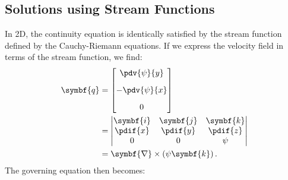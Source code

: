 \documentclass{article}
\theoremstyle{definition}
\begin{document}
\subsection{Solutions using Stream Functions}
In 2D, the continuity equation is identically satisfied by the stream
function defined by the Cauchy-Riemann equations. If we express the
velocity field in terms of the stream function, we find:
\begin{align*}
    \symbf{q} & =
    \begin{bmatrix}
        \displaystyle \pdv{\psi}{y}  \\[2ex]
        \displaystyle -\pdv{\psi}{x} \\[2ex]
        0
    \end{bmatrix}
    \\
              & =
    \begin{vmatrix}
        \symbf{i}              & \symbf{j}              & \symbf{k}              \\
        \displaystyle \pdif{x} & \displaystyle \pdif{y} & \displaystyle \pdif{z} \\
        0                      & 0                      & \psi
    \end{vmatrix}
    \\
              & = \symbf{\nabla} \times \left( \psi \symbf{k} \right).
\end{align*}
The governing equation then becomes:
\begingroup
\allowdisplaybreaks
\end{document}
